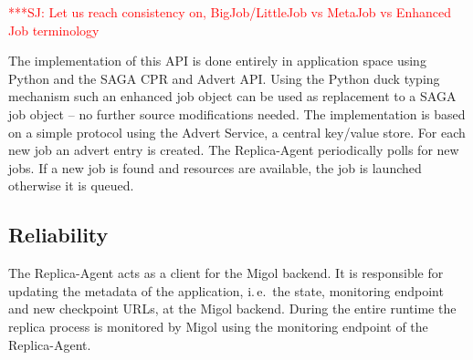 \documentclass{rspublic}
\newcommand{\jhanote}[1]{ {\textcolor{red} { ***SJ: #1 }}}
\newcommand{\jhanote}[1]{}
\newcommand{\replicaagent}[1]{Replica-Agent }
\begin{document}
\jhanote{Let us reach consistency on, BigJob/LittleJob vs MetaJob vs
  Enhanced Job terminology}


The implementation of this API is done entirely in application space using Python and
the SAGA CPR and Advert API. Using the Python duck typing mechanism such an
enhanced job object can be used as replacement to a SAGA job object --
no further source modifications needed. The implementation is based on
a simple protocol using the Advert Service, a central key/value store.
For each new job an advert entry is created. The \replicaagent\
periodically polls for new jobs.  If a new job is found and resources
are available, the job is launched otherwise it is queued.

\subsection{Reliability}
                                                                
The \replicaagent\ acts as a client for the Migol
backend. It is responsible for updating the metadata of the
application, i.\,e.\ the state, monitoring endpoint and new checkpoint
URLs, at the Migol backend. During the entire runtime the replica
process is monitored by Migol using the monitoring endpoint of the
Replica-Agent.
                           

               
\end{document}
